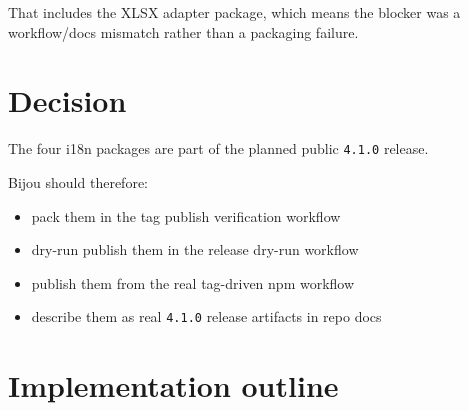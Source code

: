 That includes the XLSX adapter package, which means the blocker was a workflow/docs mismatch rather than a packaging failure.

\section{Decision}\label{record-203-decision}

The four i18n packages are part of the planned public \texttt{4\allowbreak{}.\allowbreak{}1\allowbreak{}.\allowbreak{}0} release.

Bijou should therefore:

\begin{itemize}
\tightlist
\item
  pack them in the tag publish verification workflow
\item
  dry-run publish them in the release dry-run workflow
\item
  publish them from the real tag-driven npm workflow
\item
  describe them as real \texttt{4\allowbreak{}.\allowbreak{}1\allowbreak{}.\allowbreak{}0} release artifacts in repo docs
\end{itemize}

\section{Implementation outline}\label{record-203-implementation-outline}

